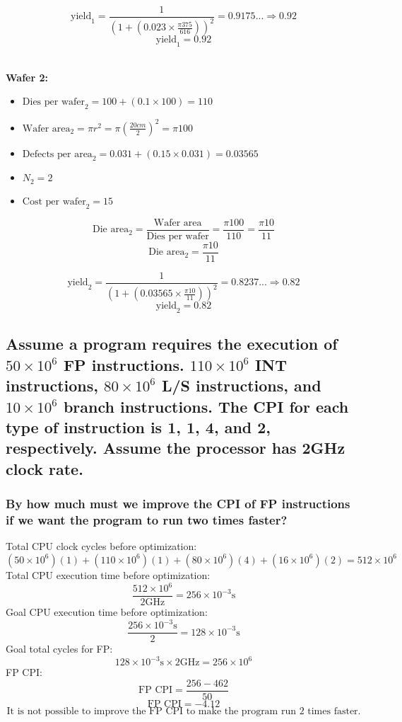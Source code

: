 \documentclass[fleqn]{article}
\begin{document}
\[ \text{yield}_1 = \frac{1}{(1 + (0.023 \times \frac{\pi375}{616}))^2} = 0.9175... \Rightarrow 0.92\]
\[ \boxed{\text{yield}_1 = 0.92}\]


\textbf{\\Wafer 2:}
\begin{itemize}[leftmargin=*]
    \item $\text{Dies per wafer}_2 = 100 + (0.1 \times 100) = 110$
    \item $\text{Wafer area}_2 = \pi r ^2 = \pi (\frac{20cm}{2})^2 = \pi100$
    \item $\text{Defects per area}_2 = 0.031 + (0.15 \times 0.031) = 0.03565$
    \item $N_2 = 2$
    \item $\text{Cost per wafer}_2 = 15$
\end{itemize}
\[ \text{Die area}_2 = \frac{\text{Wafer area}}{\text{Dies per wafer}} = \frac{\pi100}{110} = \frac{\pi10}{11} \]
\[ \boxed{\text{Die area}_2 = \frac{\pi10}{11}} \]

\[ \text{yield}_2 = \frac{1}{(1 + (0.03565 \times \frac{\pi10}{11}))^2} = 0.8237... \Rightarrow 0.82 \]
\[ \boxed{\text{yield}_2 = 0.82} \]

\pagebreak
\setcounter{subsection}{14}
\subsection{Assume a program requires the execution of $50 \times 10^6$ FP instructions. $110 \times 10^6$ INT instructions, $80 \times 10^6$ L/S instructions, and $10 \times 10^6$ branch instructions. The CPI for each type of instruction is 1, 1, 4, and 2, respectively. Assume the processor has 2GHz clock rate.}

\subsubsection{By how much must we improve the CPI of FP instructions if we want the program to run two times faster?}
Total CPU clock cycles before optimization:
\[ (50 \times 10^6)(1) + (110 \times 10^6)(1) + (80 \times 10^6)(4) + (16 \times 10^6)(2) =  512 \times 10^6 \]
Total CPU execution time before optimization:
\[ \frac{ 512 \times 10^6}{2 \text{GHz}} = 256 \times 10^{-3} \text{s}\]
Goal CPU execution time before optimization:
\[ \frac{256 \times 10^{-3} \text{s}}{2} = 128 \times 10^{-3} \text{s}\]
Goal total cycles for FP:
\[128 \times 10^{-3} \text{s} \times 2\text{GHz} =  256 \times 10^6\]
FP CPI:
\[ \text{FP CPI} =  \frac{256 - 462}{50} \]
\[ \text{FP CPI} = -4.12 \]
\[ \boxed{\text{It is not possible to improve the FP CPI to make the program run 2 times faster.}} \]
\end{document}
